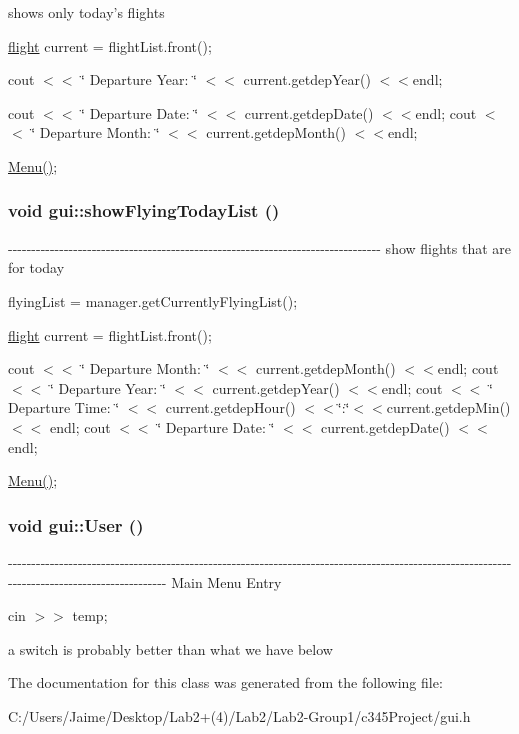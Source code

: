shows only today's flights

\hyperlink{classflight}{flight} current = flightList.front();

cout $<$$<$ \char`\"{}	Departure Year: \char`\"{} $<$$<$ current.getdepYear() $<$$<$endl;

cout $<$$<$ \char`\"{}	Departure Date: \char`\"{} $<$$<$ current.getdepDate() $<$$<$endl; cout $<$$<$ \char`\"{}	Departure Month: \char`\"{} $<$$<$ current.getdepMonth() $<$$<$endl;

\hyperlink{classgui_a57cd3dc1eca1d8cb7aabb9fa75d79702}{Menu()}; \hypertarget{classgui_ad42a2964e4ab71b2f1df11bf0f193d4d}{
\subsubsection[{showFlyingTodayList}]{\setlength{\rightskip}{0pt plus 5cm}void gui::showFlyingTodayList ()}}
\label{classgui_ad42a2964e4ab71b2f1df11bf0f193d4d}
-\/-\/-\/-\/-\/-\/-\/-\/-\/-\/-\/-\/-\/-\/-\/-\/-\/-\/-\/-\/-\/-\/-\/-\/-\/-\/-\/-\/-\/-\/-\/-\/-\/-\/-\/-\/-\/-\/-\/-\/-\/-\/-\/-\/-\/-\/-\/-\/-\/-\/-\/-\/-\/-\/-\/-\/-\/-\/-\/-\/-\/-\/-\/-\/-\/-\/-\/-\/-\/-\/-\/-\/-\/-\/-\/-\/-\/-\/-\/-\/ show flights that are for today 

flyingList = manager.getCurrentlyFlyingList();

\hyperlink{classflight}{flight} current = flightList.front();

cout $<$$<$ \char`\"{}	Departure Month: \char`\"{} $<$$<$ current.getdepMonth() $<$$<$endl; cout $<$$<$ \char`\"{}	Departure Year: \char`\"{} $<$$<$ current.getdepYear() $<$$<$endl; cout $<$$<$ \char`\"{}	Departure Time: \char`\"{} $<$$<$ current.getdepHour() $<$$<$\char`\"{}:\char`\"{}$<$$<$current.getdepMin() $<$$<$ endl; cout $<$$<$ \char`\"{}	Departure Date: \char`\"{} $<$$<$ current.getdepDate() $<$$<$endl;

\hyperlink{classgui_a57cd3dc1eca1d8cb7aabb9fa75d79702}{Menu()}; \hypertarget{classgui_a3c2584790da727b2c2fabc178c449ea3}{
\subsubsection[{User}]{\setlength{\rightskip}{0pt plus 5cm}void gui::User ()}}
\label{classgui_a3c2584790da727b2c2fabc178c449ea3}
-\/-\/-\/-\/-\/-\/-\/-\/-\/-\/-\/-\/-\/-\/-\/-\/-\/-\/-\/-\/-\/-\/-\/-\/-\/-\/-\/-\/-\/-\/-\/-\/-\/-\/-\/-\/-\/-\/-\/-\/-\/-\/-\/-\/-\/-\/-\/-\/-\/-\/-\/-\/-\/-\/-\/-\/-\/-\/-\/-\/-\/-\/-\/-\/-\/-\/-\/-\/-\/-\/-\/-\/-\/-\/-\/-\/-\/-\/-\/-\/-\/-\/-\/-\/-\/-\/-\/-\/-\/-\/-\/-\/-\/-\/-\/-\/-\/-\/-\/-\/-\/-\/-\/-\/-\/-\/-\/-\/-\/-\/-\/-\/-\/-\/-\/-\/-\/-\/-\/-\/-\/-\/-\/-\/-\/-\/-\/-\/-\/-\/-\/-\/-\/-\/-\/-\/-\/-\/-\/-\/-\/-\/ Main Menu Entry 

cin $>$$>$ temp;

a switch is probably better than what we have below 

The documentation for this class was generated from the following file:\begin{DoxyCompactItemize}
\item 
C:/Users/Jaime/Desktop/Lab2+(4)/Lab2/Lab2-\/Group1/c345Project/gui.h\end{DoxyCompactItemize}
